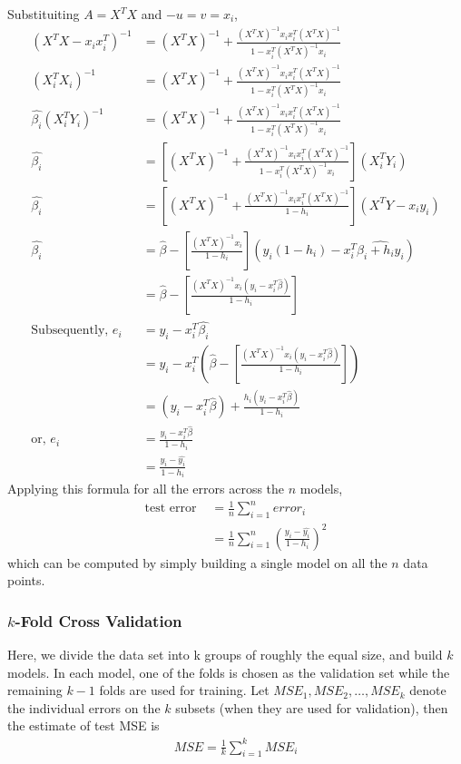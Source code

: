 \documentclass[11pt, a4paper]{article}
\begin{document}
    Substituiting $A = X^{T}X$ and $-u = v = x_{i}$,
    \begin{align*}
        (X^{T}X - x_{i}x_{i}^{T})^{-1} &= (X^{T}X)^{-1} + \frac{(X^{T}X)^{-1}x_{i}x_{i}^{T}(X^{T}X)^{-1}}{1-x_{i}^{T}(X^{T}X)^{-1}x_{i}}\\
        (X_{i}^{T}X_{i})^{-1} &= (X^{T}X)^{-1} + \frac{(X^{T}X)^{-1}x_{i}x_{i}^{T}(X^{T}X)^{-1}}{1-x_{i}^{T}(X^{T}X)^{-1}x_{i}}\\
        \hat{\beta_{i}}(X_{i}^{T}Y_{i})^{-1} &= (X^{T}X)^{-1} + \frac{(X^{T}X)^{-1}x_{i}x_{i}^{T}(X^{T}X)^{-1}}{1-x_{i}^{T}(X^{T}X)^{-1}x_{i}}\\
        \hat{\beta_{i}} &= [(X^{T}X)^{-1} + \frac{(X^{T}X)^{-1}x_{i}x_{i}^{T}(X^{T}X)^{-1}}{1-x_{i}^{T}(X^{T}X)^{-1}x_{i}}](X_{i}^{T}Y_{i})\\
        \hat{\beta_{i}} &= [(X^{T}X)^{-1} + \frac{(X^{T}X)^{-1}x_{i}x_{i}^{T}(X^{T}X)^{-1}}{1-h_{i}}](X^{T}Y - x_{i}y_{i})\\
        \hat{\beta_{i}} &= \hat{\beta} - [\frac{(X^{T}X)^{-1}x_{i}}{1-h_{i}}](y_{i}(1-h_{i})-x_{i}^{T}\hat{\beta_{i}+h_{i}y_{i}})\\
        &= \hat{\beta} - [\frac{(X^{T}X)^{-1}x_{i}(y_{i}-x_{i}^{T}\hat{\beta})}{1-h_{i}}]\\
        \text{Subsequently, } e_{i} &= y_{i} - x_{i}^{T}\hat{\beta_{i}}\\
                                &= y_{i} - x_{i}^{T}(\hat{\beta} - [\frac{(X^{T}X)^{-1}x_{i}(y_{i}-x_{i}^{T}\hat{\beta})}{1-h_{i}}])\\
                                &= (y_{i}-x_{i}^{T}\hat{\beta}) + \frac{h_{i}(y_{i}-x_{i}^{T}\hat{\beta})}{1-h_{i}}\\
            \text{or, } e_{i} &= \frac{y_{i}-x_{i}^{T}\hat{\beta}}{1-h_{i}}\\
                             &= \frac{y_{i}-\hat{y_{i}}}{1-h_{i}}
    \end{align*}
    Applying this formula for all the errors across the $n$ models,
    \begin{align*}
        \text{test error } &= \frac{1}{n}\sum_{i=1}^{n} error_{i}\\
                        &= \frac{1}{n}\sum_{i=1}^{n} (\frac{y_{i}-\hat{y_{i}}}{1-h_{i}})^{2}
    \end{align*}
    which can be computed by simply building a single model on all the $n$ data points.
    

    \subsubsection{$k$-Fold Cross Validation}
    Here, we divide the data set into k groups of roughly the equal size, and build $k$ models. In each model, one of the folds is chosen as the validation set while the remaining $k-1$ folds are used for training. Let $MSE_{1}, MSE_{2}, \ldots, MSE_{k}$ denote the individual errors on the $k$ subsets (when they are used for validation), then the estimate of test MSE is
    \begin{align*}
        MSE = \frac{1}{k}\sum_{i=1}^{k}MSE_{i}
    \end{align*}
\end{document}
